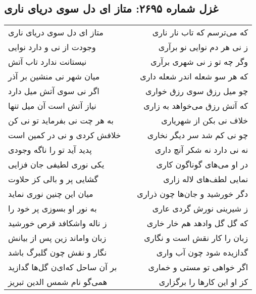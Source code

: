 \begin{center}
\section*{غزل شماره ۲۶۹۵: متاز ای دل سوی دریای ناری}
\label{sec:2695}
\begin{longtable}{l p{0.5cm} r}
متاز ای دل سوی دریای ناری
&&
که می‌ترسم که تاب نار ناری
\\
وجودت از نی و دارد نوایی
&&
ز نی هر دم نوایی نو برآری
\\
نیستانت ندارد تاب آتش
&&
وگر چه تو ز نی شهری برآری
\\
میان شهر نی منشین بر آذر
&&
که هر سو شعله اندر شعله داری
\\
اگر نی سوی آتش میل دارد
&&
چو میل رزق سوی رزق خواری
\\
نیاز آتش است آن میل تنها
&&
که آتش رزق می‌خواهد به زاری
\\
به هر چت نی بفرماید تو نی کن
&&
خلاف نی بکن از شهریاری
\\
خلافش کردی و نی در کمین است
&&
چو نی کم شد سر دیگر نخاری
\\
پدید آید تو را ناگه وجودی
&&
نه نی دارد نه شکر آنچ داری
\\
یکی نوری لطیفی جان فزایی
&&
در او می‌های گوناگون کاری
\\
گشایی پر و بالی کز حلاوت
&&
نمایی لطف‌های لاله زاری
\\
میان این چنین نوری نماید
&&
دگر خورشید و جان‌ها چون ذراری
\\
به نور او بسوزی پر خود را
&&
ز شیرینی نورش گردی عاری
\\
ز ناله واشکافد قرص خورشید
&&
که گل گل وادهد هم خار خاری
\\
زبان واماند زین پس از بیانش
&&
زبان را کار نقش است و نگاری
\\
نگار و نقش چون گلبرگ باشد
&&
گدازیده شود چون آب واری
\\
بر آن ساحل که‌ای‌ن گل‌ها گدازید
&&
اگر خواهی تو مستی و خماری
\\
همی‌گو نام شمس الدین تبریز
&&
کز او این کارها را برگزاری
\\
\end{longtable}
\end{center}
